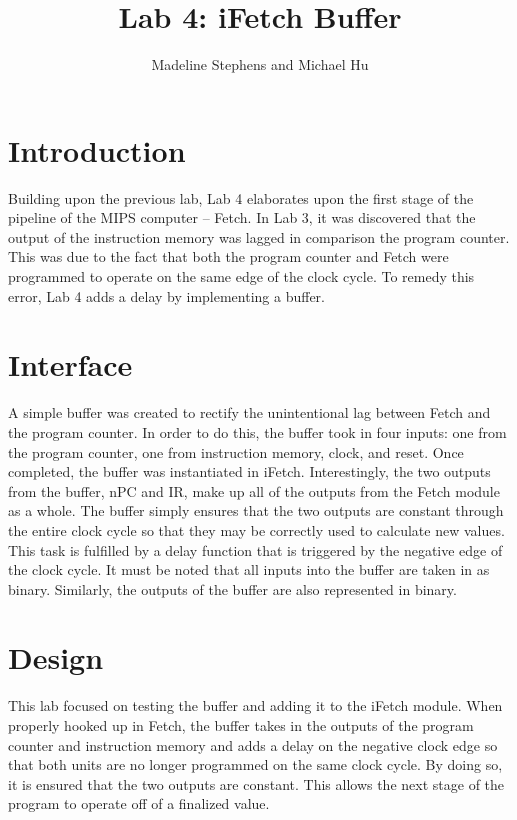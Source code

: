 \documentclass{article}
\author{Madeline Stephens and Michael Hu}
\title{Lab 4: iFetch Buffer}
\begin{document}
\maketitle

\section{Introduction}

Building upon the previous lab, Lab 4 elaborates upon the first stage of the pipeline of the MIPS computer -- Fetch. In Lab 3, it was discovered that the output of the instruction memory was lagged in comparison the program counter. This was due to the fact that both the program counter and Fetch were programmed to operate on the same edge of the clock cycle. To remedy this error, Lab 4 adds a delay by implementing a buffer.

\section{Interface}

A simple buffer was created to rectify the unintentional lag between Fetch and the program counter. In order to do this, the buffer took in four inputs: one from the program counter, one from instruction memory, clock, and reset. Once completed, the buffer was instantiated in iFetch. Interestingly, the two outputs from the buffer, nPC and IR, make up all of the outputs from the Fetch module as a whole. The buffer simply ensures that the two outputs are constant through the entire clock cycle so that they may be correctly used to calculate new values. This task is fulfilled by a delay function that is triggered by the negative edge of the clock cycle. It must be noted that all inputs into the buffer are taken in as binary. Similarly, the outputs of the buffer are also represented in binary. 


\section{Design}
This lab focused on testing the buffer and adding it to the iFetch module. When properly hooked up in Fetch, the buffer takes in the outputs of the program counter and instruction memory and adds a delay on the negative clock edge so that both units are no longer programmed on the same clock cycle. By doing so, it is ensured that the two outputs are constant. This allows the next stage of the program to operate off of a finalized value. 
\end{document}
